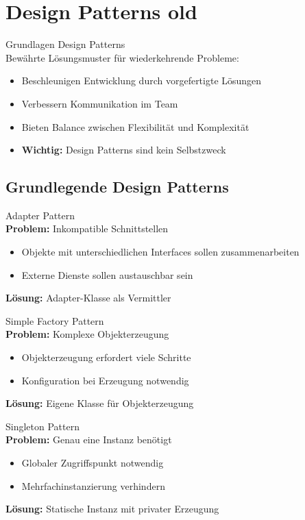 

\section{Design Patterns old}

\begin{concept}{Grundlagen Design Patterns}\\
Bewährte Lösungsmuster für wiederkehrende Probleme:
\begin{itemize}
    \item Beschleunigen Entwicklung durch vorgefertigte Lösungen
    \item Verbessern Kommunikation im Team
    \item Bieten Balance zwischen Flexibilität und Komplexität
    \item \textbf{Wichtig:} Design Patterns sind kein Selbstzweck
\end{itemize}
\end{concept}

\subsection{Grundlegende Design Patterns}

\begin{definition}{Adapter Pattern}\\
\textbf{Problem:} Inkompatible Schnittstellen
\begin{itemize}
    \item Objekte mit unterschiedlichen Interfaces sollen zusammenarbeiten
    \item Externe Dienste sollen austauschbar sein
\end{itemize}
\textbf{Lösung:} Adapter-Klasse als Vermittler
\end{definition}

\begin{definition}{Simple Factory Pattern}\\
\textbf{Problem:} Komplexe Objekterzeugung
\begin{itemize}
    \item Objekterzeugung erfordert viele Schritte
    \item Konfiguration bei Erzeugung notwendig
\end{itemize}
\textbf{Lösung:} Eigene Klasse für Objekterzeugung
\end{definition}

\begin{definition}{Singleton Pattern}\\
\textbf{Problem:} Genau eine Instanz benötigt
\begin{itemize}
    \item Globaler Zugriffspunkt notwendig
    \item Mehrfachinstanzierung verhindern
\end{itemize}
\textbf{Lösung:} Statische Instanz mit privater Erzeugung
\end{definition}

